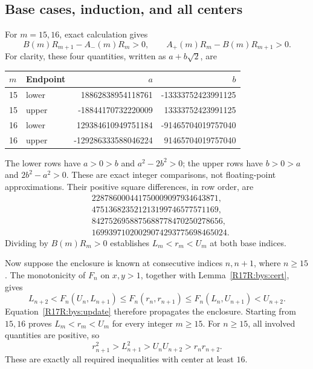 \documentclass[11pt,a4paper]{article}
\begin{document}
\subsection{Base cases, induction, and all centers}
For $m=15,16$, exact calculation gives
\[
 B(m)R_{m+1}-A_-(m)R_m>0,\qquad
 A_+(m)R_m-B(m)R_{m+1}>0.
\]
For clarity, these four quantities, written as $a+b\sqrt2$, are
\begin{center}
\begin{tabular}{llrr}
\toprule
$m$ & Endpoint & $a$ & $b$\\\midrule
15 & lower & 18862838954118761 & -13333752423991125\\
15 & upper & -18844170732220009 & 13333752423991125\\
16 & lower & 129384610949751184 & -91465704019757040\\
16 & upper & -129286333588046224 & 91465704019757040\\\bottomrule
\end{tabular}
\end{center}
The lower rows have $a>0>b$ and $a^2-2b^2>0$; the upper rows have
$b>0>a$ and $2b^2-a^2>0$. These are exact integer comparisons, not
floating-point approximations. Their positive square differences, in
row order, are
\begin{align*}
 &228786000441750009097934643871,\\
 &475136823521213199746577571169,\\
 &8427526958875688778470250278656,\\
 &16993971020029074293775698465024.
\end{align*}
Dividing by $B(m)R_m>0$ establishes $L_m<r_m<U_m$ at both base indices.

Now suppose the enclosure is known at consecutive indices $n,n+1$,
where $n\ge15$. The monotonicity of $F_n$ on $x,y>1$, together with
Lemma~\ref{R17R:bys:cert}, gives
\[
 L_{n+2}<F_n(U_n,L_{n+1})
 \le F_n(r_n,r_{n+1})
 \le F_n(L_n,U_{n+1})<U_{n+2}.
\]
Equation~\eqref{R17R:bys:update} therefore propagates the enclosure.
Starting from $15,16$ proves $L_m<r_m<U_m$ for every integer $m\ge15$.
For $n\ge15$, all involved quantities are positive, so
\[
 r_{n+1}^2>L_{n+1}^2>U_nU_{n+2}>r_nr_{n+2}.
\]
These are exactly all required inequalities with center at least $16$.
\end{document}
